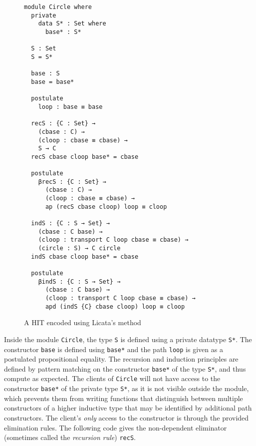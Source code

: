 \documentclass[sigplan,10pt]{acmart}
\begin{document}
\begin{figure}
\begin{center}
\begingroup
\begin{Verbatim}
module Circle where
  private
    data S* : Set where
      base* : S*

  S : Set
  S = S*

  base : S
  base = base*

  postulate
    loop : base ≡ base

  recS : {C : Set} →
    (cbase : C) →
    (cloop : cbase ≡ cbase) →
    S → C
  recS cbase cloop base* = cbase

  postulate
    βrecS : {C : Set} →
      (cbase : C) →
      (cloop : cbase ≡ cbase) →
      ap (recS cbase cloop) loop ≡ cloop

  indS : {C : S → Set} →
    (cbase : C base) →
    (cloop : transport C loop cbase ≡ cbase) →
    (circle : S) → C circle
  indS cbase cloop base* = cbase

  postulate
    βindS : {C : S → Set} →
      (cbase : C base) →
      (cloop : transport C loop cbase ≡ cbase) →
      apd (indS {C} cbase cloop) loop ≡ cloop
\end{Verbatim}
\endgroup
\end{center}
\caption{A HIT encoded using Licata's method}
\label{fig:circle-hit}
\end{figure}

Inside the module {\tt Circle}, the type {\tt S} is defined using a private datatype {\tt S*}.
The constructor {\tt base} is defined using {\tt base*} and the path {\tt loop} is given as a postulated propositional equality.
The recursion and induction principles are defined by pattern matching on the constructor {\tt base*} of the type {\tt S*}, and thus compute as expected.
The clients of {\tt Circle} will not have access to the constructor {\tt base*} of the private type {\tt S*}, as it is not visible outside the module, which prevents them from writing functions that distinguish between multiple constructors of a higher inductive type that may be identified by additional path constructors.
The client's \emph{only} access to the constructor is through the provided elimination rules. The following code gives the non-dependent eliminator (sometimes called the \emph{recursion rule}) {\tt recS}.
\end{document}
